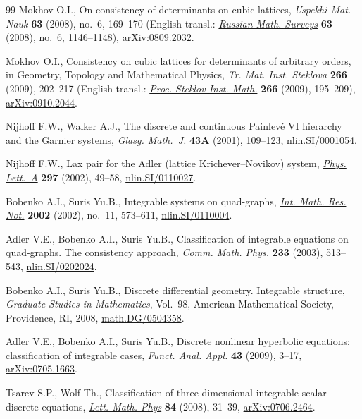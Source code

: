 \documentclass[11pt]{article}
\begin{document}
\begin{thebibliography}{99}
Mokhov O.I.,
On consistency of determinants on cubic lattices,
{\it Uspekhi Mat. Nauk} {\bf 63} (2008), no.~6, 169--170
(English transl.: \href{http://dx.doi.org/10.1070/RM2008v063n06ABEH004586}{{\it Russian Math. Surveys}} {\bf 63} (2008), no.~6, 1146--1148),
\href{http://arxiv.org/abs/0809.2032}{arXiv:0809.2032}.


Mokhov O.I.,
Consistency on cubic lattices for determinants of
arbitrary orders, in Geometry, Topology and Mathematical Physics,
{\it Tr. Mat. Inst. Steklova} {\bf 266} (2009),
202--217 (English transl.: \href{http://dx.doi.org/10.1134/S0081543809030110}{{\it Proc. Steklov Inst. Math.}} {\bf 266} (2009), 195--209),
\href{http://arxiv.org/abs/0910.2044}{arXiv:0910.2044}.


Nijhof\/f F.W., Walker A.J.,
The discrete and continuous Painlev\'e VI hierarchy and the Garnier systems,
\href{http://dx.doi.org/10.1017/S0017089501000106}{{\it Glasg. Math.~J.}} {\bf 43A} (2001), 109--123,
\href{http://arxiv.org/abs/nlin.SI/0001054}{nlin.SI/0001054}.


Nijhof\/f F.W.,
Lax pair for the Adler (lattice Krichever--Novikov) system,
\href{http://dx.doi.org/10.1016/S0375-9601(02)00287-6}{{\it Phys. Lett.~A}} {\bf 297} (2002), 49--58,
\href{http://arxiv.org/abs/nlin.SI/0110027}{nlin.SI/0110027}.


Bobenko A.I., Suris Yu.B.,
Integrable systems on quad-graphs,
\href{http://dx.doi.org/10.1155/S1073792802110075}{{\it Int. Math. Res. Not.}} {\bf 2002} (2002), no.~11, 573--611,
\href{http://arxiv.org/abs/nlin.SI/0110004}{nlin.SI/0110004}.


Adler V.E., Bobenko A.I., Suris Yu.B.,
Classif\/ication of integrable equations on quad-graphs. The consistency approach,
\href{http://dx.doi.org/10.1007/s00220-002-0762-8}{{\it Comm. Math. Phys.}} {\bf 233} (2003), 513--543,
\href{http://arxiv.org/abs/nlin.SI/0202024}{nlin.SI/0202024}.


Bobenko A.I., Suris Yu.B.,
Discrete dif\/ferential geometry. Integrable structure,
{\it Graduate Studies in Mathematics}, Vol.~98, American Mathematical Society, Providence, RI, 2008,
\href{http://arxiv.org/abs/math.DG/0504358}{math.DG/0504358}.


Adler V.E., Bobenko A.I., Suris Yu.B.,
Discrete nonlinear hyperbolic equations: classif\/ication of integrable cases,
\href{http://dx.doi.org/10.1007/s10688-009-0002-5}{{\it Funct. Anal. Appl.}} {\bf 43} (2009), 3--17,
\href{http://arxiv.org/abs/0705.1663}{arXiv:0705.1663}.


Tsarev S.P., Wolf Th.,
Classif\/ication of three-dimensional integrable scalar discrete equations,
\href{http://dx.doi.org/10.1007/s11005-008-0230-2}{{\it Lett. Math. Phys}} {\bf 84} (2008), 31--39,
\href{http://arxiv.org/abs/0706.2464}{arXiv:0706.2464}.


\end{thebibliography}
\end{document}
